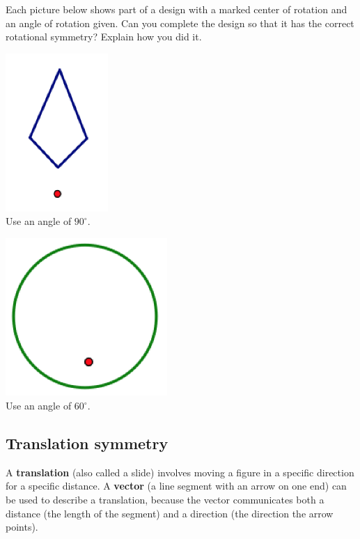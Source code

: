 \begin{problem}
Each picture below shows part of a design with a marked center of rotation and an angle of rotation given.    Can you complete the design so that it has the correct rotational symmetry?  Explain how you did it.

\begin{center}
\includegraphics[height=6cm]{makerot1}\\
Use an angle of $90^\circ$.

\vfill


\includegraphics[height=6cm]{makerot2}\\
Use an angle of $60^\circ$.

\end{center}

\vfill

\end{problem}


\newpage
\subsection*{Translation symmetry}
A {\bf translation} (also called a slide) involves moving a figure in a specific direction for a specific distance. A {\bf vector} (a line segment with an arrow on one end) can be used to describe a translation, because the vector communicates both a distance (the length of the segment) and a direction (the direction the arrow points).

